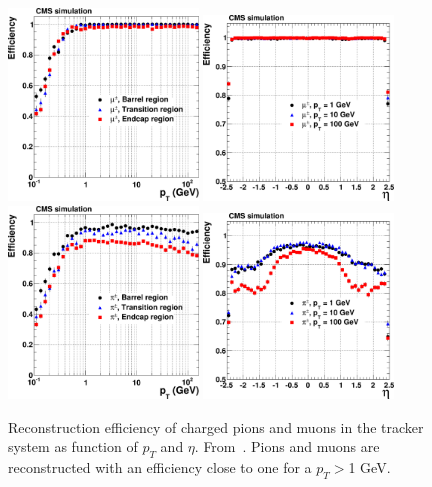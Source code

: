 \begin{figure}[!Hhtbp]
  \begin{center}
    \includegraphics[width=0.45\textwidth]{figs/eff_muon_vs_pt.png}
    \includegraphics[width=0.45\textwidth]{figs/eff_muon_vs_eta.png}
    \includegraphics[width=0.45\textwidth]{figs/eff_pion_vs_pt.png}
    \includegraphics[width=0.45\textwidth]{figs/eff_pion_vs_eta.png}
    \caption{Reconstruction efficiency of charged pions and muons in the tracker system as function of $p_{T}$ and $\eta$. From~\cite{Chatrchyan:2014fea}. Pions and muons are reconstructed with an efficiency close to one for a $p_{T}>$1 GeV. }
    \label{fig:TrackerEff}
  \end{center}
\end{figure}


